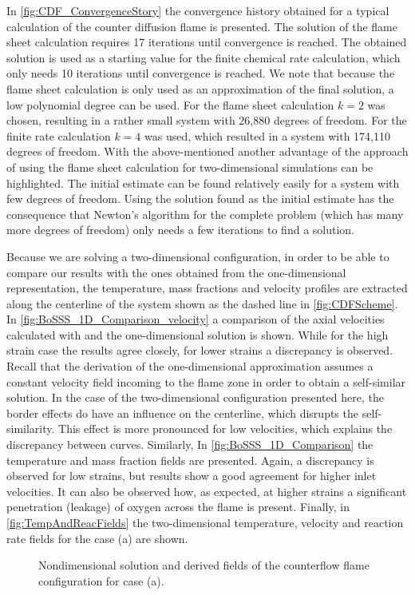 In \cref{fig:CDF_ConvergenceStory} the convergence history obtained for a typical calculation of the counter diffusion flame is presented. The solution of the flame sheet calculation requires 17 iterations until convergence is reached. The obtained solution is used as a starting value for the finite chemical rate calculation, which only needs 10 iterations until convergence is reached. We note that because the flame sheet calculation is only used as an approximation of the final solution, a low polynomial degree can be used. For the flame sheet calculation $k = 2$ was chosen, resulting in a rather small system with 26,880 degrees of freedom. For the finite rate calculation $k = 4$ was used, which resulted in a system with 174,110 degrees of freedom.  With the above-mentioned another advantage of the approach of using the flame sheet calculation for two-dimensional simulations can be highlighted. The initial estimate can be found relatively easily for a system with few degrees of freedom. Using the solution found as the initial estimate has the consequence that Newton's algorithm for the complete problem (which has many more degrees of freedom) only needs a few iterations to find a solution.

Because we are solving a two-dimensional configuration, in order to be able to compare our results with the ones obtained from the one-dimensional representation, the temperature, mass fractions and velocity profiles are extracted along the centerline of the system shown as the dashed line in \cref{fig:CDFScheme}. In \cref{fig:BoSSS_1D_Comparison_velocity} a comparison of the axial velocities calculated with \BoSSS and the one-dimensional solution is shown. While for the high strain case the results agree closely, for lower strains a discrepancy is observed. Recall that the derivation of the one-dimensional approximation assumes a constant velocity field incoming to the flame zone in order to obtain a self-similar solution. In the case of the two-dimensional configuration presented here, the border effects do have an influence on the centerline, which disrupts the self-similarity. This effect is more pronounced for low velocities, which explains the discrepancy between curves. Similarly, In \cref{fig:BoSSS_1D_Comparison} the temperature and mass fraction fields are presented. Again, a discrepancy is observed for low strains, but results show a good agreement for higher inlet velocities. It can also be observed how, as expected, \cite{fernandez-tarrazoSimpleOnestepChemistry2006} at higher strains a significant penetration (leakage) of oxygen across the flame is present. Finally, in \cref{fig:TempAndReacFields} the two-dimensional temperature, velocity and reaction rate fields for the case (a) are shown.
\newpage
\begin{figure}[t]
	\centering
	\pgfplotsset{width=0.81\textwidth, compat=1.3}
	\caption{Nondimensional solution and derived fields of the counterflow flame configuration for case (a).} \label{fig:CoFlowFlameFig1}
\end{figure}

